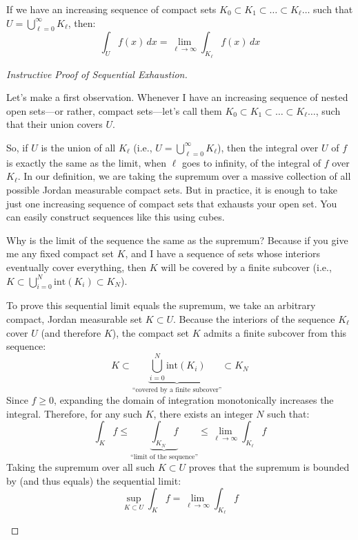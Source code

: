 \begin{orange-formula}
\begin{proposition}
If we have an increasing sequence of compact sets $K_0 \subset K_1 \subset \dots \subset K_\ell \dots$ such that $U = \bigcup_{\ell=0}^\infty K_\ell$, then:
\[
\int_U f(x) \, dx = \lim_{\ell \to \infty} \int_{K_\ell} f(x) \, dx
\]
\end{proposition}
\end{orange-formula}

\begin{proof}[Instructive Proof of Sequential Exhaustion]
\begin{spoken-clean}[00:12:07 - 00:15:00]
Let's make a first observation. Whenever I have an increasing sequence of nested open sets—or rather, compact sets—let's call them $K_0 \subset K_1 \subset \dots \subset K_\ell \dots$, such that their union covers $U$. 

So, if $U$ is the union of all $K_\ell$ (i.e., $U = \bigcup_{\ell=0}^\infty K_\ell$), then the integral over $U$ of $f$ is exactly the same as the limit, when $\ell$ goes to infinity, of the integral of $f$ over $K_\ell$. In our definition, we are taking the supremum over a massive collection of all possible Jordan measurable compact sets. But in practice, it is enough to take just one increasing sequence of compact sets that exhausts your open set. You can easily construct sequences like this using cubes.

Why is the limit of the sequence the same as the supremum? Because if you give me any fixed compact set $K$, and I have a sequence of sets whose interiors eventually cover everything, then $K$ will be covered by a finite subcover (i.e., $K \subset \bigcup_{i=0}^N \text{int}(K_i) \subset K_N$).
\end{spoken-clean}

\begin{math-stroke}
To prove this sequential limit equals the supremum, we take an arbitrary compact, Jordan measurable set $K \subset U$. 
Because the interiors of the sequence $K_\ell$ cover $U$ (and therefore $K$), the compact set $K$ admits a finite subcover from this sequence:
\[
K \subset \underbrace{\bigcup_{i=0}^N \text{int}(K_i)}_{\text{``covered by a finite subcover''}} \subset K_N
\]
Since $f \ge 0$, expanding the domain of integration monotonically increases the integral. Therefore, for any such $K$, there exists an integer $N$ such that:
\[
\int_K f \le \underbrace{\int_{K_N} f}_{\text{``limit of the sequence''}} \le \lim_{\ell \to \infty} \int_{K_\ell} f
\]
Taking the supremum over all such $K \subset U$ proves that the supremum is bounded by (and thus equals) the sequential limit:
\[
\sup_{K \subset U} \int_K f = \lim_{\ell \to \infty} \int_{K_\ell} f
\]


\end{math-stroke}
\end{proof}
